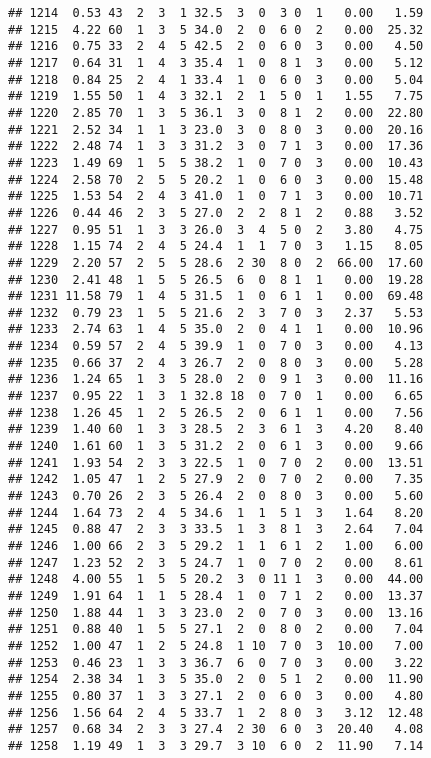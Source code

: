 \documentclass[
]{article}
\begin{document}
\begin{verbatim}
## 1214  0.53 43  2  3  1 32.5  3  0  3 0  1   0.00   1.59
## 1215  4.22 60  1  3  5 34.0  2  0  6 0  2   0.00  25.32
## 1216  0.75 33  2  4  5 42.5  2  0  6 0  3   0.00   4.50
## 1217  0.64 31  1  4  3 35.4  1  0  8 1  3   0.00   5.12
## 1218  0.84 25  2  4  1 33.4  1  0  6 0  3   0.00   5.04
## 1219  1.55 50  1  4  3 32.1  2  1  5 0  1   1.55   7.75
## 1220  2.85 70  1  3  5 36.1  3  0  8 1  2   0.00  22.80
## 1221  2.52 34  1  1  3 23.0  3  0  8 0  3   0.00  20.16
## 1222  2.48 74  1  3  3 31.2  3  0  7 1  3   0.00  17.36
## 1223  1.49 69  1  5  5 38.2  1  0  7 0  3   0.00  10.43
## 1224  2.58 70  2  5  5 20.2  1  0  6 0  3   0.00  15.48
## 1225  1.53 54  2  4  3 41.0  1  0  7 1  3   0.00  10.71
## 1226  0.44 46  2  3  5 27.0  2  2  8 1  2   0.88   3.52
## 1227  0.95 51  1  3  3 26.0  3  4  5 0  2   3.80   4.75
## 1228  1.15 74  2  4  5 24.4  1  1  7 0  3   1.15   8.05
## 1229  2.20 57  2  5  5 28.6  2 30  8 0  2  66.00  17.60
## 1230  2.41 48  1  5  5 26.5  6  0  8 1  1   0.00  19.28
## 1231 11.58 79  1  4  5 31.5  1  0  6 1  1   0.00  69.48
## 1232  0.79 23  1  5  5 21.6  2  3  7 0  3   2.37   5.53
## 1233  2.74 63  1  4  5 35.0  2  0  4 1  1   0.00  10.96
## 1234  0.59 57  2  4  5 39.9  1  0  7 0  3   0.00   4.13
## 1235  0.66 37  2  4  3 26.7  2  0  8 0  3   0.00   5.28
## 1236  1.24 65  1  3  5 28.0  2  0  9 1  3   0.00  11.16
## 1237  0.95 22  1  3  1 32.8 18  0  7 0  1   0.00   6.65
## 1238  1.26 45  1  2  5 26.5  2  0  6 1  1   0.00   7.56
## 1239  1.40 60  1  3  3 28.5  2  3  6 1  3   4.20   8.40
## 1240  1.61 60  1  3  5 31.2  2  0  6 1  3   0.00   9.66
## 1241  1.93 54  2  3  3 22.5  1  0  7 0  2   0.00  13.51
## 1242  1.05 47  1  2  5 27.9  2  0  7 0  2   0.00   7.35
## 1243  0.70 26  2  3  5 26.4  2  0  8 0  3   0.00   5.60
## 1244  1.64 73  2  4  5 34.6  1  1  5 1  3   1.64   8.20
## 1245  0.88 47  2  3  3 33.5  1  3  8 1  3   2.64   7.04
## 1246  1.00 66  2  3  5 29.2  1  1  6 1  2   1.00   6.00
## 1247  1.23 52  2  3  5 24.7  1  0  7 0  2   0.00   8.61
## 1248  4.00 55  1  5  5 20.2  3  0 11 1  3   0.00  44.00
## 1249  1.91 64  1  1  5 28.4  1  0  7 1  2   0.00  13.37
## 1250  1.88 44  1  3  3 23.0  2  0  7 0  3   0.00  13.16
## 1251  0.88 40  1  5  5 27.1  2  0  8 0  2   0.00   7.04
## 1252  1.00 47  1  2  5 24.8  1 10  7 0  3  10.00   7.00
## 1253  0.46 23  1  3  3 36.7  6  0  7 0  3   0.00   3.22
## 1254  2.38 34  1  3  5 35.0  2  0  5 1  2   0.00  11.90
## 1255  0.80 37  1  3  3 27.1  2  0  6 0  3   0.00   4.80
## 1256  1.56 64  2  4  5 33.7  1  2  8 0  3   3.12  12.48
## 1257  0.68 34  2  3  3 27.4  2 30  6 0  3  20.40   4.08
## 1258  1.19 49  1  3  3 29.7  3 10  6 0  2  11.90   7.14

\end{verbatim}
\end{document}
